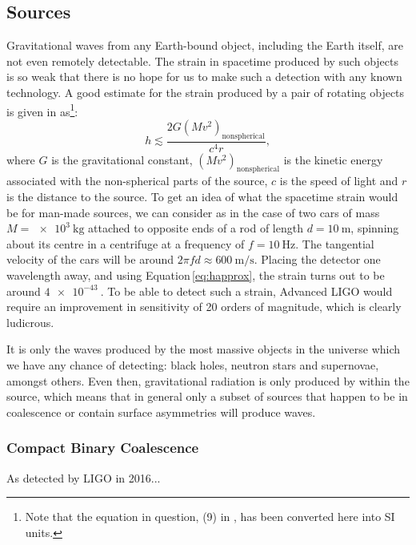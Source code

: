 
\subsection{Sources}
Gravitational waves from any Earth-bound object, including the Earth itself, are not even remotely detectable. The strain in spacetime produced by such objects is so weak that there is no hope for us to make such a detection with any known technology. A good estimate for the strain produced by a pair of rotating objects is given in \cite{Sathyaprakash2009} as\footnote{Note that the equation in question, (9) in \cite{Sathyaprakash2009}, has been converted here into SI units.}:
\begin{equation}
  \label{eq:happrox}
  h \lesssim \frac{2 G \left( M v^{2} \right)_{\text{nonspherical}}}{c^4 r},
\end{equation}
where $G$ is the gravitational constant, $\left( M v^{2} \right)_{\text{nonspherical}}$ is the kinetic energy associated with the non-spherical parts of the source, $c$ is the speed of light and $r$ is the distance to the source. To get an idea of what the spacetime strain would be for man-made sources, we can consider as in \cite{Sathyaprakash2009} the case of two cars of mass $M = \SI{e3}{\kilo\gram}$ attached to opposite ends of a rod of length $d = \SI{10}{\meter}$, spinning about its centre in a centrifuge at a frequency of $f = \SI{10}{\hertz}$. The tangential velocity of the cars will be around $2 \pi f d \approx \SI{600}{\meter\per\second}$. Placing the detector one wavelength away, and using Equation\,\ref{eq:happrox}, the strain turns out to be around $\SI{4e-43}{}$. To be able to detect such a strain, Advanced LIGO would require an improvement in sensitivity of \SI{20}{} orders of magnitude, which is clearly ludicrous.

It is only the waves produced by the most massive objects in the universe which we have any chance of detecting: black holes, neutron stars and supernovae, amongst others. Even then, gravitational radiation is only produced by  within the source, which means that in general only a subset of sources that happen to be in coalescence or contain surface asymmetries will produce waves.

\subsubsection{Compact Binary Coalescence}
As detected by LIGO in 2016...

